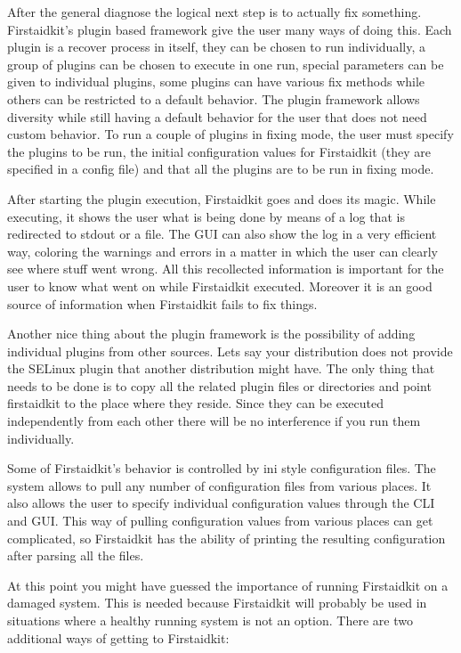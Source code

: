 \documentclass[a4paper,13pt]{article}
\begin{document}
After the general diagnose the logical next step is to actually fix something.  Firstaidkit's
plugin based framework give the user many ways of doing this.  Each plugin is a recover process
in itself, they can be chosen to run individually, a group of plugins can be chosen to execute
in one run, special parameters can be given to individual plugins, some plugins can have various
fix methods while others can be restricted to a default behavior.  The plugin framework allows
diversity while still having a default behavior for the user that does not need custom behavior.
To run a couple of plugins in fixing mode, the user must specify the plugins to be run, the
initial configuration values for Firstaidkit (they are specified in a config file) and that
all the plugins are to be run in fixing mode.

After starting the plugin execution, Firstaidkit goes and does its magic.  While executing, it
shows the user what is being done by means of a log that is redirected to stdout or a file.
The GUI can also show the log in a very efficient way, coloring the warnings and errors in a
matter in which the user can clearly see where stuff went wrong.  All this recollected
information is important for the user to know what went on while Firstaidkit executed.
Moreover it is an good source of information when Firstaidkit fails to fix things.

Another nice thing about the plugin framework is the possibility of adding individual plugins
from other sources.  Lets say your distribution does not provide the SELinux plugin that another
distribution might have.  The only thing that needs to be done is to copy all the related
plugin files or directories and point firstaidkit to the place where they reside.  Since they
can be executed independently from each other there will be no interference if you run them
individually.

Some of Firstaidkit's behavior is controlled by ini style configuration files.  The system
allows to pull any number of configuration files from various places.  It also allows the
user to specify individual configuration values through the CLI and GUI.  This way of
pulling configuration values from various places can get complicated, so Firstaidkit has
the ability of printing the resulting configuration after parsing all the files.

At this point you might have guessed the importance of running Firstaidkit on a damaged
system.  This is needed because Firstaidkit will probably be used in situations where a
healthy running system is not an option.  There are two additional ways of getting to
Firstaidkit:
\end{document}
